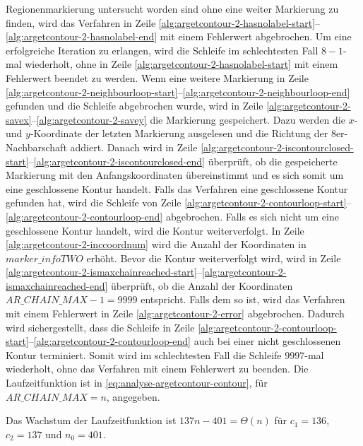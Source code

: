  Regionenmarkierung untersucht worden sind ohne eine weiter Markierung zu finden, wird das Verfahren in Zeile
 \ref{alg:argetcontour-2-hasnolabel-start}--\ref{alg:argetcontour-2-hasnolabel-end} mit einem Fehlerwert abgebrochen.
 Um eine erfolgreiche Iteration zu erlangen, wird die Schleife im schlechtesten Fall $8-1$-mal wiederholt, ohne in Zeile
 \ref{alg:argetcontour-2-hasnolabel-start} mit einem Fehlerwert beendet zu werden. Wenn eine weitere Markierung in
 Zeile \ref{alg:argetcontour-2-neighbourloop-start}--\ref{alg:argetcontour-2-neighbourloop-end} gefunden und die
 Schleife abgebrochen wurde, wird in Zeile \ref{alg:argetcontour-2-savex}--\ref{alg:argetcontour-2-savey} die
 Markierung gespeichert. Dazu werden die $x$- und $y$-Koordinate der letzten Markierung ausgelesen und die Richtung der
 8er-Nachbarschaft addiert. Danach wird in Zeile
 \ref{alg:argetcontour-2-iscontourclosed-start}--\ref{alg:argetcontour-2-iscontourclosed-end} überprüft, ob die
 gespeicherte Markierung mit den Anfangskoordinaten übereinstimmt und es sich somit um eine geschlossene Kontur
 handelt. Falls das Verfahren eine geschlossene Kontur gefunden hat, wird die Schleife von Zeile
 \ref{alg:argetcontour-2-contourloop-start}--\ref{alg:argetcontour-2-contourloop-end} abgebrochen. Falls es sich nicht
 um eine geschlossene Kontur handelt, wird die Kontur weiterverfolgt. In Zeile \ref{alg:argetcontour-2-inccoordnum}
 wird die Anzahl der Koordinaten in $\mathit{marker\_infoTWO}$ erhöht. Bevor die Kontur weiterverfolgt wird, wird in
 Zeile \ref{alg:argetcontour-2-ismaxchainreached-start}--\ref{alg:argetcontour-2-ismaxchainreached-end} überprüft, ob
 die Anzahl der Koordinaten $\mathit{AR\_CHAIN\_MAX} - 1 = 9999$ entspricht. Falls dem so ist, wird das Verfahren mit
 einem Fehlerwert in Zeile \ref{alg:argetcontour-2-error} abgebrochen. Dadurch wird sichergestellt, dass die Schleife
 in Zeile \ref{alg:argetcontour-2-contourloop-start}--\ref{alg:argetcontour-2-contourloop-end} auch bei einer nicht
 geschlossenen Kontur terminiert. Somit wird im schlechtesten Fall die Schleife $9997$-mal wiederholt, ohne das
 Verfahren mit einem Fehlerwert zu beenden. Die Laufzeitfunktion ist in \autoref{eq:analyse-argetcontour-contour},
 für $\mathit{AR\_CHAIN\_MAX} = n$, angegeben.

Das Wachstum der Laufzeitfunktion ist $137n -401 = \Theta(n)$ für $c_{1} = 136$, $c_{2} = 137$ und $n_{0} = 401$.

